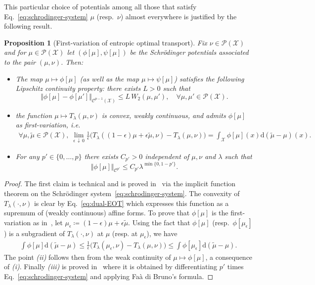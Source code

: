 \documentclass[11pt]{article}
\newcommand{\Cc}{\mathcal{C}}
\newcommand{\Pp}{\mathcal{P}}
\newcommand{\Xx}{\mathcal{X}}
\renewcommand{\d}{\mathrm{d}}
\newtheorem{proposition}[theorem]{Proposition}
\begin{document}
This particular choice of potentials among all those that satisfy Eq.~\eqref{eq:schrodinger-system} $\mu$ (resp.~$\nu$) almost everywhere is justified by the following result.
\begin{proposition}[First-variation of entropic optimal transport]\label{prop:propertiesEOT} Fix $\nu \in \Pp(\Xx)$ and for $\mu\in \Pp(\Xx)$ let $(\phi[\mu],\psi[\mu])$ be the Schr\"odinger potentials associated to the pair $(\mu,\nu)$. Then:
\begin{itemize}
\item[(i)] The map $\mu\mapsto \phi[\mu]$ (as well as the map $\mu\mapsto \psi[\mu]$) satisfies the following Lipschitz continuity property: there exists $L>0$ such that
\[
\Vert \phi[\mu] - \phi[\mu']\Vert_{\Cc^{p-1}(\Xx)} \leq L\, W_2(\mu,\mu'),\quad \forall \mu,\mu'\in \Pp(\Xx).
\]
\item[(ii)]  the function 
$\mu\mapsto T_\lambda(\mu,\nu)$ is convex, weakly continuous, and admits $\phi[\mu]$ as first-variation, i.e.
\begin{align}
\forall \mu,\tilde \mu \in \Pp(\Xx),\; \lim_{\epsilon\, \downarrow\, 0}\frac{1}{\epsilon} \Big( T_\lambda((1-\epsilon)\mu+\epsilon \tilde \mu,\nu) - T_\lambda(\mu,\nu)\Big) = \int_\Xx \phi[\mu](x)\d (\tilde \mu-\mu)(x) .
\end{align}
\item[(iii)] For any $p'\in \{0,\dots,p\}$ there exists $C_{p'}>0$ independent of $\mu,\nu$ and $\lambda$ such that
\[
\Vert \phi[\mu]\Vert_{\Cc^{p'}} \leq C_{p'}\lambda^{\min\{0, 1-p'\}}.
\]

\end{itemize}
\end{proposition}
\begin{proof}
The first claim is technical and is proved in~\cite{carlier2024displacement} via the implicit function theorem on the Schr\"odinger system~\eqref{eq:schrodinger-system}. The convexity of $T_\lambda(\cdot,\nu)$ is clear by Eq.~\eqref{eq:dual-EOT} which expresses this function as a supremum of (weakly continuous) affine forms. To prove that $\phi[\mu]$ is the first-variation as in~\cite{feydy2019interpolating}, let $\mu_\epsilon \coloneqq (1-\epsilon)\mu+\epsilon\tilde \mu$. Using the fact that $\phi[\mu]$ (resp.~$\phi[\mu_\epsilon]$) is a subgradient of $T_\lambda(\cdot,\nu)$ at $\mu$ (resp. at $\mu_\epsilon$), we have
\begin{align*}
 \int \phi[\mu]\d(\tilde\mu-\mu)\leq \frac1\epsilon \Big(T_\lambda(\mu_\epsilon,\nu)-T_\lambda(\mu,\nu)\Big) \leq \int \phi[\mu_\epsilon]\d(\tilde \mu-\mu).
\end{align*}
The point \emph{(ii)} follows then from the weak continuity of $\mu\mapsto \phi[\mu]$, a consequence of \emph{(i)}. Finally \emph{(iii)} is proved in~\cite{genevay2019sample} where it is obtained by differentiating $p'$ times Eq.~\eqref{eq:schrodinger-system}  and applying Fa\`a di Bruno's formula.
\end{proof}
\end{document}
